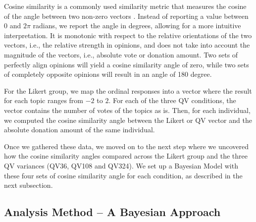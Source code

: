 Cosine similarity is a commonly used similarity metric 
that measures the cosine of the angle between two non-zero vectors \cite{singhal2001modern}. Instead of reporting a value between $0$ and $2 \pi$ radians, we report the angle in degrees, allowing for a more intuitive interpretation.
It is monotonic with respect to the relative orientations of the two vectors, i.e., the relative strength in opinions, and does not take into account the magnitude of the vectors, i.e., absolute vote or donation amount. Two sets of perfectly align opinions will yield a cosine similarity angle of zero, while two sets of completely opposite opinions will result in an angle of 180 degree.

For the Likert group, we map the ordinal responses into a vector where the result for each topic ranges from $-2$ to $2$. For each of the three QV conditions, the vector contains the number of votes of the topics as is. Then, for each individual, we computed the cosine similarity angle between the Likert or QV vector and the absolute donation amount of the same individual. 

Once we gathered these data, we moved on to the next step where we uncovered how the cosine similarity angles compared across the Likert group and the three QV variances (QV36, QV108 and QV324). We set up a Bayesian Model with these four sets of cosine similarity angle for each condition, as described in the next subsection.

\subsection{Analysis Method -- A Bayesian Approach}
\label{exp1:The Bayesian Model}



